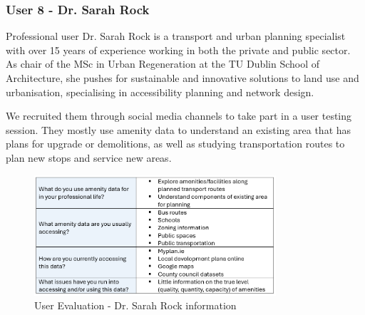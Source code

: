 \newpage
\subsubsection{User 8 - Dr. Sarah Rock}
Professional user Dr. Sarah Rock is a transport and urban planning specialist
with over 15 years of experience working in both the private and public sector.
As chair of the MSc in Urban Regeneration at the TU Dublin School of
Architecture, she pushes for sustainable and innovative solutions to land use
and urbanisation, specialising in accessibility planning and network design.

We recruited them through social media channels to take part in a user testing
session. They mostly use amenity data to understand an existing area that has
plans for upgrade or demolitions, as well as studying transportation routes to
plan new stops and service new areas.
\begin{figure}[h!]
    \centering
    \includegraphics[width=0.8\textwidth]{images/sarah-amenity-info.png}
    \caption{User Evaluation - Dr. Sarah Rock information}
\end{figure}

